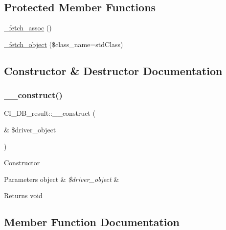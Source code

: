 \subsection*{Protected Member Functions}
\begin{DoxyCompactItemize}
\item 
\mbox{\hyperlink{class_c_i___d_b__result_a57cf0fdf1ecf52d72a998a62566be0fc}{\+\_\+fetch\+\_\+assoc}} ()
\item 
\mbox{\hyperlink{class_c_i___d_b__result_a5acbf9e2350f9a8a846d2ea933da3e21}{\+\_\+fetch\+\_\+object}} (\$class\+\_\+name=\textquotesingle{}std\+Class\textquotesingle{})
\end{DoxyCompactItemize}


\subsection{Constructor \& Destructor Documentation}
\mbox{\label{class_c_i___d_b__result_a402837467122c8953ae195a05f64aebd}} 
\subsubsection{\texorpdfstring{\+\_\+\+\_\+construct()}{\_\_construct()}}
{\footnotesize\ttfamily C\+I\+\_\+\+D\+B\+\_\+result\+::\+\_\+\+\_\+construct (\begin{DoxyParamCaption}\item[{\&}]{\$driver\+\_\+object }\end{DoxyParamCaption})}

Constructor


\begin{DoxyParams}[1]{Parameters}
object & {\em \$driver\+\_\+object} & \\
\hline
\end{DoxyParams}
\begin{DoxyReturn}{Returns}
void 
\end{DoxyReturn}


\subsection{Member Function Documentation}
\mbox{\label{class_c_i___d_b__result_a57cf0fdf1ecf52d72a998a62566be0fc}} 
